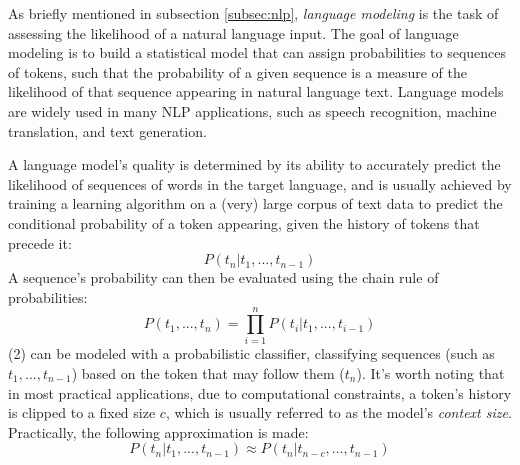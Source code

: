 \documentclass{article}
\begin{document}

\medskip
\noindent
As briefly mentioned in subsection \ref{subsec:nlp}, \emph{language modeling} is the task of assessing the likelihood of a natural language input. The goal of language modeling is to build a statistical model that can assign probabilities to sequences of tokens, such that the probability of a given sequence is a measure of the likelihood of that sequence appearing in natural language text. Language models are widely used in many NLP applications, such as speech recognition, machine translation, and text generation.

\medskip
\noindent
A language model's quality is determined by its ability to accurately predict the likelihood of sequences of words in the target language, and is usually achieved by training a learning algorithm on a (very) large corpus of text data to predict the conditional probability of a token appearing, given the history of tokens that precede it:
\begin{equation}
    P(t_n | t_{1},...,t_{n-1}) 
\end{equation}
A sequence's probability can then be evaluated using the chain rule of probabilities:
\begin{equation*}
    P(t_1,...,t_n) = \prod_{i=1}^{n} P(t_i | t_{1},...,t_{i-1})
\end{equation*}
(2) can be modeled with a probabilistic classifier, classifying sequences (such as $t_1,...,t_{n-1}$) based on the token that may follow them ($t_n$). It's worth noting that in most practical applications, due to computational constraints, a token's history is clipped to a fixed size $c$, which is usually referred to as the model's \emph{context size}. Practically, the following approximation is made:
\begin{equation*}
    P(t_n | t_{1},...,t_{n-1}) \approx P(t_n | t_{n-c},...,t_{n-1})  
\end{equation*}
\end{document}
